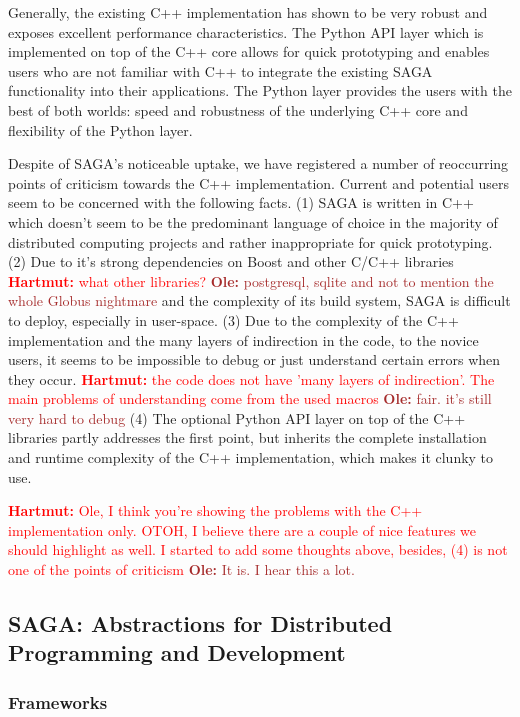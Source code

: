 \documentclass{article}
\newcommand{\B}[1]{\textbf{#1}}
\newcommand{\ownote}[1]{{\textcolor{Brown}{   \B{Ole:     } #1 }}}
\newcommand{\hknote}[1]{{\textcolor{red}{  \B{Hartmut: } #1 }}}
\newcommand{\ownote}[1]{}
\newcommand{\hknote}[1]{}
\begin{document}
Generally, the existing C++ implementation has shown to be very robust
and exposes excellent performance characteristics. The Python API
layer which is implemented on top of the C++ core allows for quick
prototyping and enables users who are not familiar with C++ to
integrate the existing SAGA functionality into their applications. The
Python layer provides the users with the best of both worlds: speed
and robustness of the underlying C++ core and flexibility of the
Python layer.

Despite of SAGA's noticeable uptake, we have registered a number of
reoccurring points of criticism towards the C++
implementation. Current and potential users seem to be concerned with
the following facts. (1) SAGA is written in C++ which doesn't seem to
be the predominant language of choice in the majority of distributed
computing projects and rather inappropriate for quick prototyping. (2)
Due to it's strong dependencies on Boost and other C/C++ libraries
\hknote{what other libraries?} \ownote{postgresql, sqlite and not to
  mention the whole Globus nightmare} and the complexity of its build
system, SAGA is difficult to deploy, especially in user-space. (3) Due
to the complexity of the C++ implementation and the many layers of
indirection in the code, to the novice users, it seems to be
impossible to debug or just understand certain errors when they
occur. \hknote{the code does not have 'many layers of
  indirection'. The main problems of understanding come from the used
  macros} \ownote{fair. it's still very hard to debug} (4) The
optional Python API layer on top of the C++ libraries partly addresses
the first point, but inherits the complete installation and runtime
complexity of the C++ implementation, which makes it clunky to use.

\hknote{Ole, I think you're showing the problems with the C++
  implementation only. OTOH, I believe there are a couple of nice
  features we should highlight as well. I started to add some thoughts
  above, besides, (4) is not one of the points of criticism}
\ownote{It is. I hear this a lot.}

\subsection{SAGA: Abstractions for Distributed Programming and
  Development}

\subsubsection{Frameworks}
\end{document}
